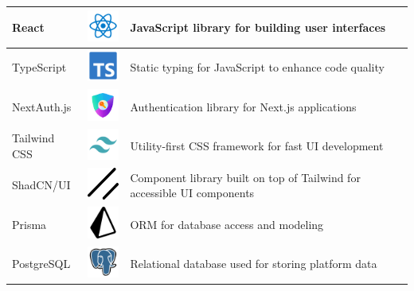\begin{longtable}{|m{3.5cm}|m{4cm}|m{6.5cm}|}
    \hline
    React & \includegraphics[width=1.5cm]{pictures/web/logo/reactts-svgrepo-com.png} & JavaScript library for building user interfaces \\
    \hline
    TypeScript & \includegraphics[width=1.5cm]{pictures/web/logo/typescript-official-svgrepo-com.png} & Static typing for JavaScript to enhance code quality \\
    \hline
    NextAuth.js & \includegraphics[width=1.5cm]{pictures/web/logo/next-authe.png} & Authentication library for Next.js applications \\
    \hline
    Tailwind CSS & \includegraphics[width=1.5cm]{pictures/web/logo/tailwind-svgrepo-com.png} & Utility-first CSS framework for fast UI development \\
    \hline
    ShadCN/UI & \includegraphics[width=1.5cm]{pictures/web/logo/shad-cn-ui.png} & Component library built on top of Tailwind for accessible UI components \\
    \hline
    Prisma & \includegraphics[width=1.5cm]{pictures/web/logo/prisma.png} & ORM for database access and modeling \\
    \hline
    PostgreSQL & \includegraphics[width=1.5cm]{pictures/web/logo/pgsql-svgrepo-com.png} & Relational database used for storing platform data \\

\end{longtable}
